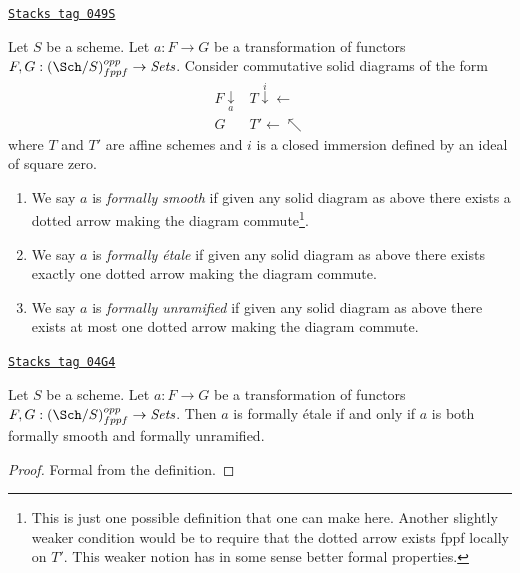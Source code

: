 \begin{definition}
\label{spaces-more-morphisms-definition-formally-smooth-etale-unramified}
\href{https://stacks.math.columbia.edu/tag/049S}{\texttt{Stacks tag 049S}}

Let $S$ be a scheme.
Let $a : F \to G$ be a transformation of functors
$F, G : (\Sch/S)_{fppf}^{opp} \to \textit{Sets}$.
Consider commutative solid diagrams of the form
$$
\begin{array}{cc}F \underset{a}{\downarrow} & T \overset{i}{\downarrow}\longleftarrow \\ G & T' \longleftarrow\nwarrow\end{array}
$$
where $T$ and $T'$ are affine schemes and $i$ is a closed immersion
defined by an ideal of square zero.
\begin{enumerate}
\item We say $a$ is {\it formally smooth} if given any solid
diagram as above there exists a dotted arrow making the diagram
commute\footnote{This is just one possible definition that one can
make here. Another slightly weaker condition would be to require that
the dotted arrow exists fppf locally on $T'$. This weaker notion
has in some sense better formal properties.}.
\item We say $a$ is {\it formally \'etale} if given any solid
diagram as above there exists exactly one dotted arrow making the diagram
commute.
\item We say $a$ is {\it formally unramified} if given any solid
diagram as above there exists at most one dotted arrow making the diagram
commute.
\end{enumerate}
\end{definition}

\begin{lemma}
\label{spaces-more-morphisms-lemma-formally-etale-is-combination}
\href{https://stacks.math.columbia.edu/tag/04G4}{\texttt{Stacks tag 04G4}}

Let $S$ be a scheme.
Let $a : F \to G$ be a transformation of functors
$F, G : (\Sch/S)_{fppf}^{opp} \to \textit{Sets}$.
Then $a$ is formally \'etale if and only if $a$ is both formally
smooth and formally unramified.
\end{lemma}

\begin{proof}
Formal from the definition.
\end{proof}

